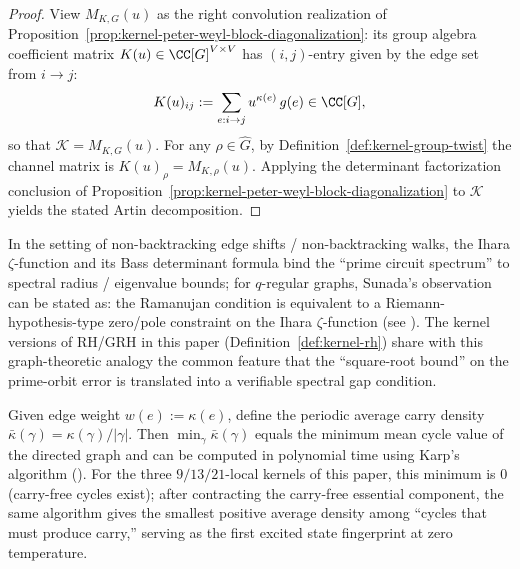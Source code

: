 \begin{proof}
View $M_{K,G}(u)$ as the right convolution realization of Proposition~\ref{prop:kernel-peter-weyl-block-diagonalization}: its group algebra coefficient matrix \(K(u)\in\CC[G]^{V\times V}\) has \((i,j)\)-entry given by the edge set from \(i\to j\):
\[
K(u)_{ij}:=\sum_{e:i\to j}u^{\kappa(e)}\,g(e)\in\CC[G],
\]
so that \(\mathcal{K}=M_{K,G}(u)\).
For any \(\rho\in\widehat G\), by Definition~\ref{def:kernel-group-twist} the channel matrix is
\(
K(u)_\rho=M_{K,\rho}(u)
\).
Applying the determinant factorization conclusion of Proposition~\ref{prop:kernel-peter-weyl-block-diagonalization} to \(\mathcal{K}\) yields the stated Artin decomposition.
\end{proof}

\begin{remark}\label{rem:kernel-graph-rh}
In the setting of non-backtracking edge shifts / non-backtracking walks, the Ihara \(\zeta\)-function and its Bass determinant formula bind the ``prime circuit spectrum'' to spectral radius / eigenvalue bounds; for $q$-regular graphs, Sunada's observation can be stated as: the Ramanujan condition is equivalent to a Riemann-hypothesis-type zero/pole constraint on the Ihara \(\zeta\)-function (see \cite{TerrasZetaGraphs,StarkTerras1996GraphCoverings}).
The kernel versions of RH/GRH in this paper (Definition~\ref{def:kernel-rh}) share with this graph-theoretic analogy the common feature that the ``square-root bound'' on the prime-orbit error is translated into a verifiable spectral gap condition.
\end{remark}

\begin{remark}\label{rem:kernel-min-cycle-mean}
Given edge weight $w(e):=\kappa(e)$, define the periodic average carry density
\(
\bar\kappa(\gamma)=\kappa(\gamma)/|\gamma|.
\)
Then $\min_{\gamma}\bar\kappa(\gamma)$ equals the minimum mean cycle value of the directed graph and can be computed in polynomial time using Karp's algorithm (\cite{Karp1978MinCycleMean}).
For the three $9/13/21$-local kernels of this paper, this minimum is $0$ (carry-free cycles exist); after contracting the carry-free essential component, the same algorithm gives the smallest positive average density among ``cycles that must produce carry,'' serving as the first excited state fingerprint at zero temperature.
\end{remark}

